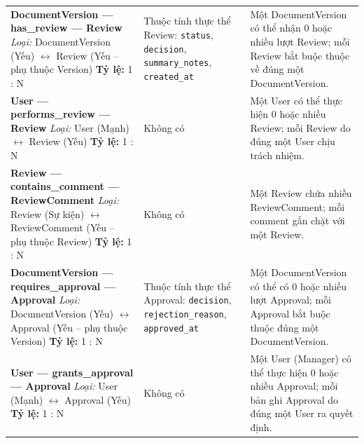 \begin{longtable}{|
>{\raggedright\arraybackslash}p{}|
>{\raggedright\arraybackslash}p{}|
>{\raggedright\arraybackslash}p{}|}
\rowcolor{gray!10}
\multicolumn{3}{|l|}{\textbf{E. Nhóm Kiểm duyệt \& Phê duyệt (Review \& Governance Domain)}} \\
\hline

\textbf{DocumentVersion --- has\_review --- Review}\newline
\textit{Loại:} DocumentVersion (Yếu) $\leftrightarrow$ Review (Yếu -- phụ thuộc Version)\newline
\textbf{Tỷ lệ:} 1 : N
& 
Thuộc tính thực thể Review:\newline
\texttt{status}, \texttt{decision},\newline
\texttt{summary\_notes}, \texttt{created\_at}
& 
Một DocumentVersion có thể nhận 0 hoặc nhiều lượt Review; mỗi Review bắt buộc thuộc về đúng một DocumentVersion.
\\ \hline

\textbf{User --- performs\_review --- Review}\newline
\textit{Loại:} User (Mạnh) $\leftrightarrow$ Review (Yếu)\newline
\textbf{Tỷ lệ:} 1 : N
& 
Không có
& 
Một User có thể thực hiện 0 hoặc nhiều Review; mỗi Review do đúng một User chịu trách nhiệm.
\\ \hline

\textbf{Review --- contains\_comment --- ReviewComment}\newline
\textit{Loại:} Review (Sự kiện) $\leftrightarrow$ ReviewComment (Yếu -- phụ thuộc Review)\newline
\textbf{Tỷ lệ:} 1 : N
& 
Không có
& 
Một Review chứa nhiều ReviewComment; mỗi comment gắn chặt với một Review.
\\ \hline

\textbf{DocumentVersion --- requires\_approval --- Approval}\newline
\textit{Loại:} DocumentVersion (Yếu) $\leftrightarrow$ Approval (Yếu -- phụ thuộc Version)\newline
\textbf{Tỷ lệ:} 1 : N
& 
Thuộc tính thực thể Approval:\newline
\texttt{decision}, \texttt{rejection\_reason},\newline
\texttt{approved\_at}
& 
Một DocumentVersion có thể có 0 hoặc nhiều lượt Approval; mỗi Approval bắt buộc thuộc đúng một DocumentVersion.
\\ \hline

\textbf{User --- grants\_approval --- Approval}\newline
\textit{Loại:} User (Mạnh) $\leftrightarrow$ Approval (Yếu)\newline
\textbf{Tỷ lệ:} 1 : N
& 
Không có
& 
Một User (Manager) có thể thực hiện 0 hoặc nhiều Approval; mỗi bản ghi Approval do đúng một User ra quyết định.
\\ \hline


\end{longtable}
